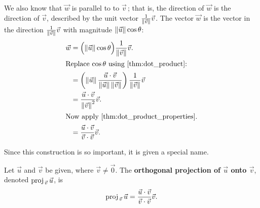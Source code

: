 We also know that $\vec w$ is parallel to to $\vec v$\,; that is, the direction of $\vec w$ is the direction of $\vec v$, described by the unit vector $\frac{1}{\norm{\vec v}}\vec v$. The vector $\vec w$ is the vector in the direction $\frac{1}{\norm{\vec v}}\vec v$ with magnitude $\norm{\vec u}\cos \theta$:
\begin{align*}
\vec w &= \Bigl(\norm{\vec u}\cos\theta \Bigr)\frac{1}{\norm{\vec v}}\vec v.\\
\intertext{Replace \intertextmath{\cos\theta} using \autoref{thm:dot_product}:}
			&= \left(\norm{\vec u}\frac{\vec u\cdot\vec v}{\norm{\vec u}\norm{\vec v}}\right)\frac{1}{\norm{\vec v}} \vec v\\ 
			&= \frac{\vec u\cdot\vec v}{\norm{\vec v}^2}\vec v.\\
			\intertext{Now apply \autoref{thm:dot_product_properties}.}
			&= \frac{\vec u\cdot\vec v}{\vec v\cdot\vec v}\vec v.
\end{align*}

Since this construction is so important, it is given a special name.

\begin{definition}\label{def:orthogonal_projection}%
Let $\vec u$ and $\vec v$ be given, where $\vec v\neq\vec 0$. The \textbf{orthogonal projection of $\vec u$ onto $\vec v$}, denoted $\proj uv$, is 
\[\proj uv = \frac{\vec u\cdot\vec v}{\vec v\cdot\vec v}\vec v.\]
\end{definition}

